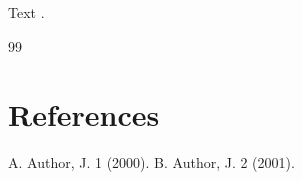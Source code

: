 \documentclass[aps,prl]{revtex4-1}
\begin{document}
Text \cite{a,b}.
\begin{thebibliography}{99}
\section*{References}
 A. Author, J. 1 (2000).
 B. Author, J. 2 (2001).
\end{thebibliography}
\end{document}
